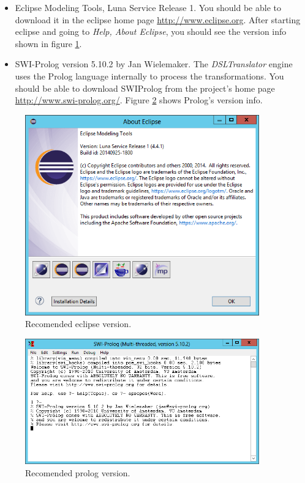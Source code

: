 \begin{itemize}
  \item Eclipse Modeling Tools, Luna Service Release 1. You should be able to
  download it in the eclipse home page \url{http://www.eclipse.org}. After
  starting eclipse and going to \emph{Help, About Eclipse}, you should see the
  version info shown in figure \ref{fig:rec_eclipse_version}.
  \item SWI-Prolog version 5.10.2 by Jan Wielemaker. The \emph{DSLTranslator}
  engine uses the Prolog language internally to process the transformations. You should
  be able to download SWIProlog from the project's home page
  \url{http://www.swi-prolog.org/}. Figure \ref{fig:rec_prolog_version} shows
  Prolog's version info.
\end{itemize}


\begin{figure}[H]
\begin{center}
  \includegraphics[width=0.9\textwidth]{imgs/eclipse_version.png}
  \caption{Recomended eclipse version.}
  \label{fig:rec_eclipse_version}
\end{center}
\end{figure}

\begin{figure}[H]
\begin{center}
  \includegraphics[width=0.9\textwidth]{imgs/prolog_version.png}
  \caption{Recomended prolog version.}
  \label{fig:rec_prolog_version}
\end{center}
\end{figure}


